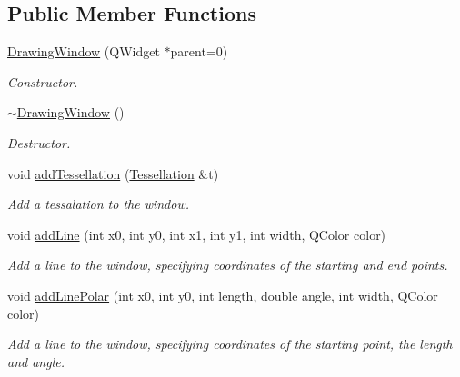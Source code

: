 \subsection*{Public Member Functions}
\begin{DoxyCompactItemize}
\item 
\hypertarget{class_drawing_window_aff3d1b3cbeee8f0e92b49c050d8ca494}{}\hyperlink{class_drawing_window_aff3d1b3cbeee8f0e92b49c050d8ca494}{Drawing\+Window} (Q\+Widget $\ast$parent=0)\label{class_drawing_window_aff3d1b3cbeee8f0e92b49c050d8ca494}

\begin{DoxyCompactList}\small\item\em Constructor. \end{DoxyCompactList}\item 
\hypertarget{class_drawing_window_a0d07890a752adffee1f92a463561dcb6}{}\hyperlink{class_drawing_window_a0d07890a752adffee1f92a463561dcb6}{$\sim$\+Drawing\+Window} ()\label{class_drawing_window_a0d07890a752adffee1f92a463561dcb6}

\begin{DoxyCompactList}\small\item\em Destructor. \end{DoxyCompactList}\item 
void \hyperlink{class_drawing_window_ac5a412fbb239f1f57cabe7a850e1e4fb}{add\+Tessellation} (\hyperlink{class_tessellation}{Tessellation} \&t)
\begin{DoxyCompactList}\small\item\em Add a tessalation to the window. \end{DoxyCompactList}\item 
void \hyperlink{class_drawing_window_a3097e096223530c9f93737441d77422f}{add\+Line} (int x0, int y0, int x1, int y1, int width, Q\+Color color)
\begin{DoxyCompactList}\small\item\em Add a line to the window, specifying coordinates of the starting and end points. \end{DoxyCompactList}\item 
void \hyperlink{class_drawing_window_ae03504caa7648347ec56eb58cf5b5db4}{add\+Line\+Polar} (int x0, int y0, int length, double angle, int width, Q\+Color color)
\begin{DoxyCompactList}\small\item\em Add a line to the window, specifying coordinates of the starting point, the length and angle. \end{DoxyCompactList}\end{DoxyCompactItemize}
